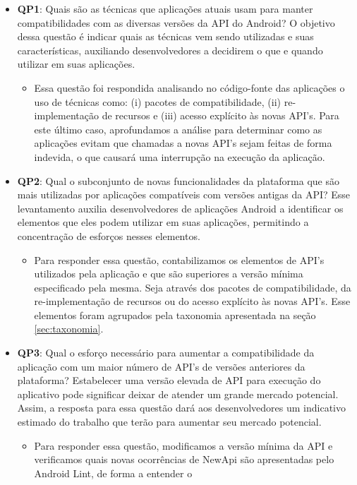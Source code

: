 \begin{itemize}
	\item \textbf{QP1}: Quais são as técnicas que aplicações atuais usam para manter
	compatibilidades com as diversas versões da API do Android? O objetivo dessa questão
	é indicar quais as técnicas vem sendo utilizadas e suas características, auxiliando
	desenvolvedores a decidirem o que e quando utilizar em suas aplicações.
		\begin{itemize}
			\item Essa questão foi respondida analisando no código-fonte das aplicações o
			uso de técnicas como: (i) pacotes de compatibilidade, (ii) re-implementação de
			recursos e (iii) acesso explícito às novas API's. Para este último caso,
			aprofundamos a análise para determinar como as aplicações evitam que chamadas
			a novas API's sejam feitas de forma indevida, o que causará uma interrupção na
			execução da aplicação.
		\end{itemize}
	\item \textbf{QP2}: Qual o subconjunto de novas funcionalidades da plataforma que são
	mais utilizadas por aplicações compatíveis com versões antigas da API? Esse levantamento
	auxilia desenvolvedores de aplicações Android a identificar os elementos que eles podem
	utilizar em suas aplicações, permitindo a concentração de esforços nesses elementos.
		\begin{itemize}
			\item Para responder essa questão, contabilizamos os elementos de API's utilizados
			pela aplicação e que são superiores a versão mínima especificado pela mesma. Seja
			através dos pacotes de compatibilidade, da re-implementação de recursos ou do acesso
			explícito às novas API's. Esse elementos foram agrupados pela taxonomia apresentada
			na seção \ref{sec:taxonomia}.
		\end{itemize}
	\item \textbf{QP3}: Qual o esforço necessário para aumentar a compatibilidade da aplicação 
	com um maior número de API's de versões anteriores da plataforma? Estabelecer uma versão
	elevada de API para execução do aplicativo pode significar deixar de atender um grande
	mercado potencial. Assim, a resposta para essa questão dará aos desenvolvedores um
	indicativo estimado do trabalho que terão para aumentar seu mercado potencial.
		\begin{itemize}
			\item Para responder essa questão, modificamos a versão mínima da API e verificamos quais
			novas ocorrências de NewApi são apresentadas pelo Android Lint, de forma a entender o

\end{itemize}
\end{itemize}
